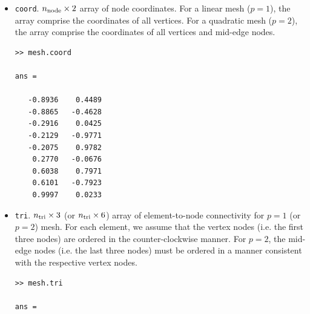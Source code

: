 \documentclass[openany,preprint,11pt]{article}
\begin{document}
\begin{itemize}
\item \texttt{coord}. $n_{\rm node} \times 2$ array of node coordinates. For a linear mesh ($p=1$), the array comprise the coordinates of all vertices.  For a quadratic mesh ($p=2$), the array comprise the coordinates of all vertices and mid-edge nodes.
\begin{verbatim}
>> mesh.coord

ans = 

   -0.8936    0.4489
   -0.8865   -0.4628
   -0.2916    0.0425
   -0.2129   -0.9771
   -0.2075    0.9782
    0.2770   -0.0676
    0.6038    0.7971
    0.6101   -0.7923
    0.9997    0.0233
\end{verbatim}
\item \texttt{tri}. $n_{\rm tri} \times 3$ (or $n_{\rm tri} \times 6$) array of element-to-node connectivity for $p=1$ (or $p=2$) mesh.  For each element, we assume that the vertex nodes (i.e. the first three nodes) are ordered in the counter-clockwise manner. For $p=2$, the mid-edge nodes (i.e. the last three nodes) must be ordered in a manner consistent with the respective vertex nodes.
\begin{verbatim}
>> mesh.tri

ans =


\end{verbatim}
\end{itemize}
\end{document}
